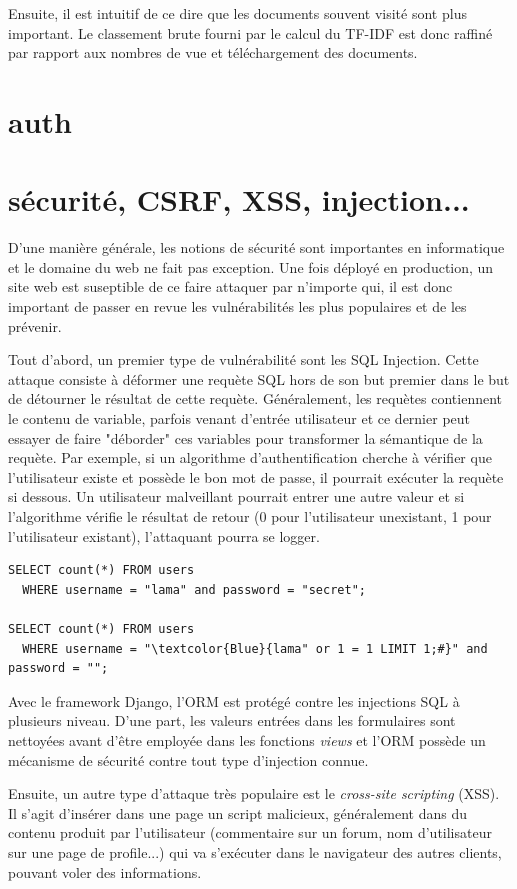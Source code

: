 \documentclass[a4paper,12pt]{article}
\begin{document}
Ensuite, il est intuitif de ce dire que les documents souvent visité sont
plus important. Le classement brute fourni par le calcul du TF-IDF est donc raffiné
par rapport aux nombres de vue et téléchargement des documents.


\section{auth}
\section{sécurité, CSRF, XSS, injection...}

D'une manière générale, les notions de sécurité sont importantes en informatique
et le domaine du web ne fait pas exception. Une fois déployé en production,
un site web est suseptible de ce faire attaquer par n'importe qui, il est donc
important de passer en revue les vulnérabilités les plus populaires et de les prévenir.

Tout d'abord, un premier type de vulnérabilité sont les SQL Injection. Cette attaque
consiste à déformer une requète SQL hors de son but premier dans le but de détourner
le résultat de cette requète. Généralement, les requètes contiennent le contenu
de variable, parfois venant d'entrée utilisateur et ce dernier peut essayer
de faire "déborder" ces variables pour transformer la sémantique de la requète. Par
exemple, si un algorithme d'authentification cherche à vérifier que l'utilisateur existe
et possède le bon mot de passe, il pourrait exécuter la requète si dessous.
Un utilisateur malveillant pourrait entrer une autre valeur et si l'algorithme
vérifie le résultat de retour (0 pour l'utilisateur unexistant, 1 pour l'utilisateur
existant), l'attaquant pourra se logger.

\begin{Verbatim}
SELECT count(*) FROM users
  WHERE username = "lama" and password = "secret";

SELECT count(*) FROM users
  WHERE username = "\textcolor{Blue}{lama" or 1 = 1 LIMIT 1;#}" and password = "";
\end{Verbatim}

Avec le framework Django, l'ORM est protégé contre les injections SQL à plusieurs
niveau. D'une part, les valeurs entrées dans les formulaires sont nettoyées avant
d'être employée dans les fonctions \textit{views} et l'ORM possède un mécanisme
de sécurité contre tout type d'injection connue.

Ensuite, un autre type d'attaque très populaire est le \textit{cross-site scripting} (XSS).
Il s'agit d'insérer dans une page un script malicieux, généralement dans du contenu
produit par l'utilisateur (commentaire sur un forum, nom d'utilisateur sur une page de profile...)
qui va s'exécuter dans le navigateur des autres clients, pouvant voler des informations.
\end{document}
